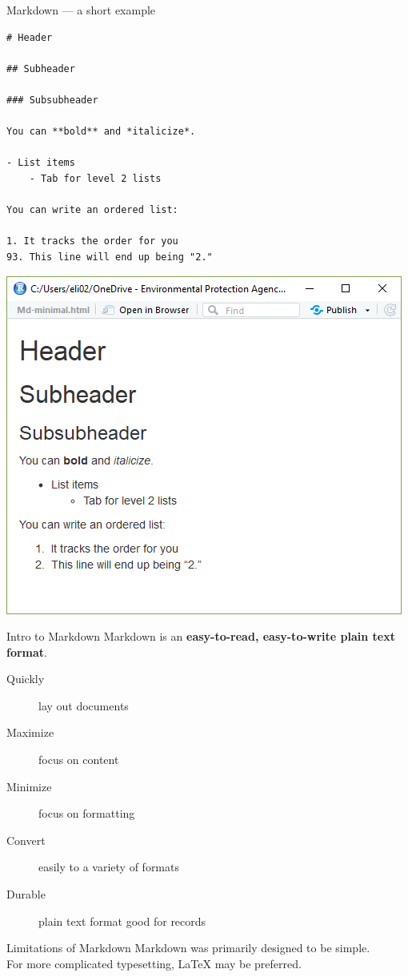 \documentclass{beamer}
\begin{document}
\begin{frame}[fragile]{Markdown --- a short example}
\begin{exampleblock}{}
\begin{lstlisting}
# Header

## Subheader 

### Subsubheader

You can **bold** and *italicize*.

- List items
    - Tab for level 2 lists

You can write an ordered list:

1. It tracks the order for you
93. This line will end up being "2."
\end{lstlisting}
\end{exampleblock}
\end{frame}

\begin{frame}[focus]
\includegraphics[height=\textheight]{Md-minimal-screenshot.PNG}
\end{frame}

\begin{frame}{Intro to Markdown}
\vfill
Markdown is an \textbf{easy-to-read, easy-to-write plain text format}.
\begin{description}
    \item[Quickly] lay out documents
    \item[Maximize] focus on content
    \item[Minimize] focus on formatting
    \item[Convert] easily to a variety of formats
    \item[Durable] plain text format good for records
\end{description}
\begin{block}{Limitations of Markdown}
Markdown was primarily designed to be simple. \\ For more complicated typesetting, LaTeX may be preferred.
\end{block}
\end{frame}
\end{document}
